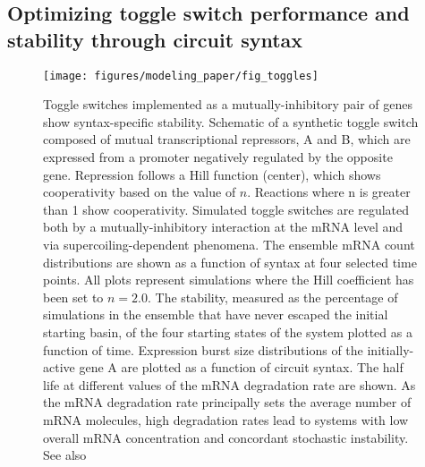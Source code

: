 \documentclass[11pt]{article} %
\begin{document}
\subsection{Optimizing toggle switch performance and stability through circuit syntax}
\begin{figure}[htbp]
    \centering
    {\texttt{[image: figures/modeling\_paper/fig\_toggles]}
    \label{fig:toggle_cartoon}
    \label{fig:toggle_basin_stability_over_time}
    \label{fig:toggle_stable_frac_n_2.0}
    \label{fig:toggle_burst_size}
    \label{fig:toggle_half_life_vs_mRNA_deg}
    }
\end{figure}
\begin{figure}[htbp]
    \ContinuedFloat
    \caption{Toggle switches implemented as a mutually-inhibitory pair of genes show syntax-specific stability.
     Schematic of a synthetic toggle switch composed of mutual transcriptional repressors, A and B, which are expressed from a promoter negatively regulated by the opposite gene. Repression follows a Hill function (center), which shows cooperativity based on the value of \(n\). Reactions where n is greater than 1 show cooperativity. Simulated toggle switches are regulated both by a mutually-inhibitory interaction at the mRNA level and via supercoiling-dependent phenomena.
     The ensemble mRNA count distributions are shown as a function of syntax at four selected time points.   All plots represent simulations where the Hill coefficient has been set to \(n = 2.0\).
     The stability, measured as the percentage of simulations in the ensemble that have never escaped the initial starting basin, of the four starting states of the system plotted as a function of time. 
     Expression burst size distributions of the initially-active gene A are plotted as a function of circuit syntax. 
     The half life at different values of the mRNA degradation rate are shown. As the mRNA degradation rate principally sets the average number of mRNA molecules, high degradation rates lead to systems with low overall mRNA concentration and concordant stochastic instability.
    See also 
} \label{fig:top:toggle_switch}
\end{figure}
\end{document}
